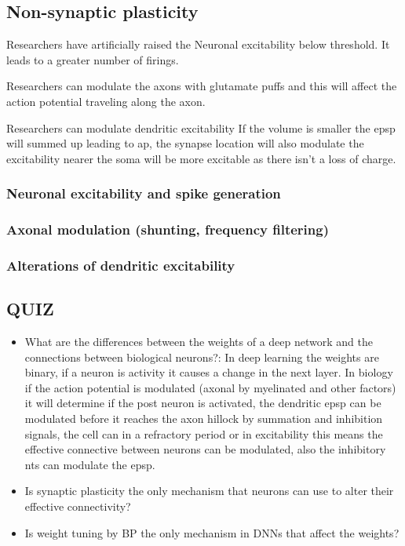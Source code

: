 \documentclass[main]{subfiles}
\begin{document}
\subsection{Non-synaptic plasticity}
Researchers have artificially raised the Neuronal excitability below threshold. It leads to a greater number of firings. 

Researchers can modulate the axons with glutamate puffs and this will affect the action potential traveling along the axon. 

Researchers can modulate dendritic excitability 
If the volume is smaller the epsp will summed up leading to ap, the synapse location will also modulate the excitability nearer the soma will be more excitable as there isn’t a loss of charge.

\subsubsection{Neuronal excitability and spike generation}
\subsubsection{Axonal modulation (shunting, frequency filtering)}
\subsubsection{Alterations of dendritic excitability}


\subsection{QUIZ}
\begin{itemize}
    \item What are the differences between the weights of a deep network and the connections between biological neurons?: 
    In deep learning the weights are binary, if a neuron is activity it causes a change in the next layer.
    In biology if the action potential is modulated (axonal by myelinated and other factors) it will determine if the post neuron is activated, the dendritic epsp can be modulated before it reaches the axon hillock by summation and inhibition signals, the cell can in a refractory period or in excitability this means the effective connective between neurons can be modulated, also the inhibitory nts can modulate the epsp.
    \item Is synaptic plasticity the only mechanism that neurons can use to alter their effective connectivity?
    \item Is weight tuning by BP the only mechanism in DNNs that affect the weights?
\end{itemize}
\end{document}
